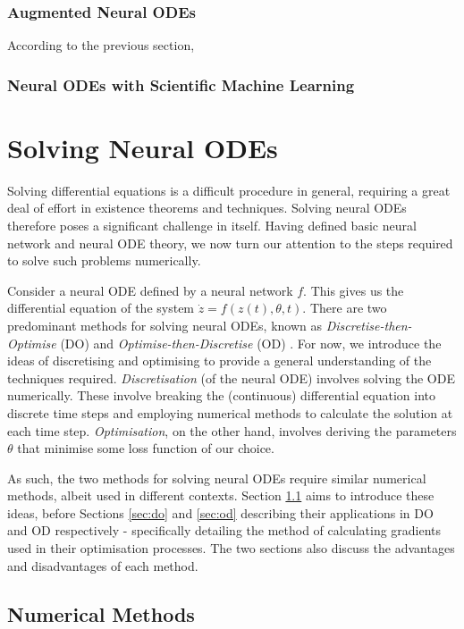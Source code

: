 \documentclass[a4paper,11pt,titlepage]{article}
\theoremstyle{definition}
\theoremstyle{plain}
\theoremstyle{remark}
\begin{document}
\subsubsection{Augmented Neural ODEs}

According to the previous section, 

\subsubsection{Neural ODEs with Scientific Machine Learning}

\pagebreak
\section{Solving Neural ODEs}
\label{sec:solvingNODEs}

Solving differential equations is a difficult procedure in general, requiring a great deal of effort in existence theorems and techniques. Solving neural ODEs therefore poses a significant challenge in itself. Having defined basic neural network and neural ODE theory, we now turn our attention to the steps required to solve such problems numerically.

Consider a neural ODE defined by a neural network $f$. This gives us the differential equation of the system $\dot{z}=f(z(t),\theta,t)$. There are two predominant methods for solving neural ODEs, known as \textit{Discretise-then-Optimise} (DO) and \textit{Optimise-then-Discretise} (OD) \cite{kidger2022neural}. For now, we introduce the ideas of discretising and optimising to provide a general understanding of the techniques required. \textit{Discretisation} (of the neural ODE) involves solving the ODE numerically. These involve breaking the (continuous) differential equation into discrete time steps and employing numerical methods to calculate the solution at each time step. \textit{Optimisation}, on the other hand, involves deriving the parameters $\theta$ that minimise some loss function of our choice. 

As such, the two methods for solving neural ODEs require similar numerical methods, albeit used in different contexts. Section \ref{sec:nummethods} aims to introduce these ideas, before Sections \ref{sec:do} and \ref{sec:od} describing their applications in DO and OD respectively - specifically detailing the method of calculating gradients used in their optimisation processes. The two sections also discuss the advantages and disadvantages of each method.

\subsection{Numerical Methods}
\label{sec:nummethods}
\end{document}
